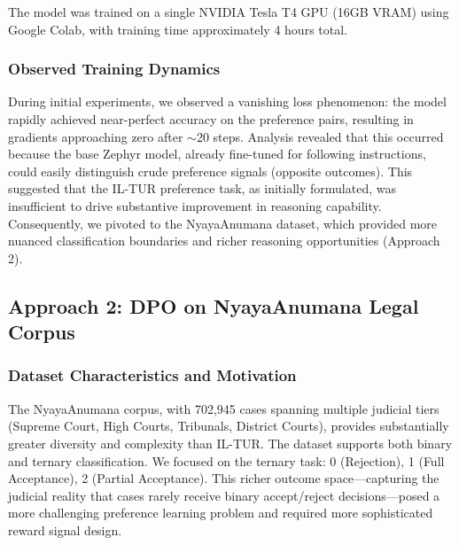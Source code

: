 \documentclass[conference]{IEEEtran}
\begin{document}
The model was trained on a single NVIDIA Tesla T4 GPU (16GB VRAM) using Google Colab, with training time approximately 4 hours total.

\subsubsection{Observed Training Dynamics}
During initial experiments, we observed a vanishing loss phenomenon: the model rapidly achieved near-perfect accuracy on the preference pairs, resulting in gradients approaching zero after $\sim$20 steps. Analysis revealed that this occurred because the base Zephyr model, already fine-tuned for following instructions, could easily distinguish crude preference signals (opposite outcomes). This suggested that the IL-TUR preference task, as initially formulated, was insufficient to drive substantive improvement in reasoning capability. Consequently, we pivoted to the NyayaAnumana dataset, which provided more nuanced classification boundaries and richer reasoning opportunities (Approach 2).

\subsection{Approach 2: DPO on NyayaAnumana Legal Corpus}

\subsubsection{Dataset Characteristics and Motivation}
The NyayaAnumana corpus, with 702,945 cases spanning multiple judicial tiers (Supreme Court, High Courts, Tribunals, District Courts), provides substantially greater diversity and complexity than IL-TUR. The dataset supports both binary and ternary classification. We focused on the ternary task: 0 (Rejection), 1 (Full Acceptance), 2 (Partial Acceptance). This richer outcome space—capturing the judicial reality that cases rarely receive binary accept/reject decisions—posed a more challenging preference learning problem and required more sophisticated reward signal design.
\end{document}
